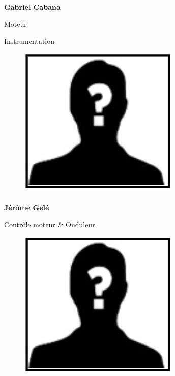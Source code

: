 \documentclass[a0paper,portrait]{baposter}
\begin{document}
\begin{poster}
{\subsubsection*{}
\vspace{-2mm}
\textbf{Gabriel Cabana}

Moteur

Instrumentation


\begin{figure}
\includegraphics[width=.9\linewidth]{img/membres/membre_placeholder.png} 
\end{figure}
\subsubsection*{}
\vspace{2mm}
\textbf{Jérôme Gelé}

Contrôle moteur \& Onduleur

\begin{figure}
\includegraphics[width=.9\linewidth]{img/membres/membre_placeholder.png} 
\end{figure}
}
\end{poster}
\end{document}
